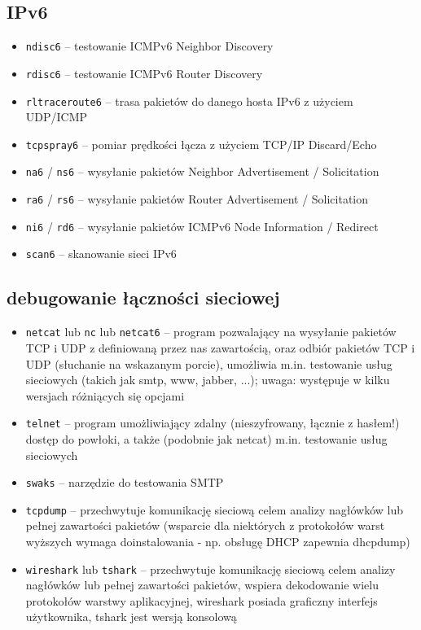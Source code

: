 \documentclass{pdfBooklets}
\begin{document}
\subsection{IPv6}
\begin{itemize}
	\item \Verb#ndisc6# –
		testowanie ICMPv6 Neighbor Discovery
	\item \Verb#rdisc6# –
		testowanie ICMPv6 Router Discovery
	\item \Verb#rltraceroute6# –
		trasa pakietów do danego hosta IPv6 z użyciem UDP/ICMP
	\item \Verb#tcpspray6# –
		pomiar prędkości łącza z użyciem TCP/IP Discard/Echo
	
	\item \Verb#na6# / \Verb#ns6# –
		wysyłanie pakietów Neighbor Advertisement / Solicitation
	\item \Verb#ra6# / \Verb#rs6# –
		wysyłanie pakietów Router Advertisement / Solicitation
	\item \Verb#ni6# / \Verb#rd6# –
		wysyłanie pakietów ICMPv6 Node Information / Redirect
	\item \Verb#scan6# –
		skanowanie sieci IPv6
\end{itemize}

\subsection{debugowanie łączności sieciowej}
\begin{itemize}
	\item \Verb#netcat# lub \Verb#nc# lub \Verb#netcat6# –
		program pozwalający na wysyłanie pakietów TCP i UDP z definiowaną przez nas zawartością, oraz odbiór pakietów TCP i UDP (słuchanie na wskazanym porcie), umożliwia m.in. testowanie usług sieciowych (takich jak smtp, www, jabber, ...); uwaga: występuje w kilku wersjach różniących się opcjami
	\item \Verb#telnet# –
		program umożliwiający zdalny (nieszyfrowany, łącznie z hasłem!) dostęp do powłoki, a także (podobnie jak netcat) m.in. testowanie usług sieciowych
	
	\item \Verb#swaks# –
		narzędzie do testowania SMTP
	
	\item \Verb#tcpdump# –
		przechwytuje komunikację sieciową celem analizy nagłówków lub pełnej zawartości pakietów
		(wsparcie dla niektórych z protokołów warst wyższych wymaga doinstalowania - np. obsługę DHCP zapewnia dhcpdump)
	\item \Verb#wireshark# lub \Verb#tshark# –
		przechwytuje komunikację sieciową celem analizy nagłówków lub pełnej zawartości pakietów, wspiera dekodowanie wielu protokołów warstwy aplikacyjnej, wireshark posiada graficzny interfejs użytkownika, tshark jest wersją konsolową
\end{itemize}
\end{document}
